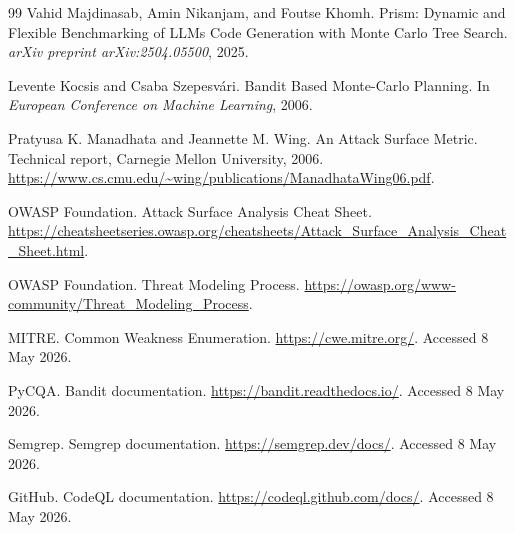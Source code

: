 \documentclass[11pt]{article}
\begin{document}
\begin{thebibliography}{99}
Vahid Majdinasab, Amin Nikanjam, and Foutse Khomh.
\newblock Prism: Dynamic and Flexible Benchmarking of LLMs Code Generation with Monte Carlo Tree Search.
\newblock \emph{arXiv preprint arXiv:2504.05500}, 2025.

Levente Kocsis and Csaba Szepesvári.
\newblock Bandit Based Monte-Carlo Planning.
\newblock In \emph{European Conference on Machine Learning}, 2006.

Pratyusa K. Manadhata and Jeannette M. Wing.
\newblock An Attack Surface Metric.
\newblock Technical report, Carnegie Mellon University, 2006.
\newblock \url{https://www.cs.cmu.edu/~wing/publications/ManadhataWing06.pdf}.

OWASP Foundation.
\newblock Attack Surface Analysis Cheat Sheet.
\newblock \url{https://cheatsheetseries.owasp.org/cheatsheets/Attack_Surface_Analysis_Cheat_Sheet.html}.

OWASP Foundation.
\newblock Threat Modeling Process.
\newblock \url{https://owasp.org/www-community/Threat_Modeling_Process}.

MITRE.
\newblock Common Weakness Enumeration.
\newblock \url{https://cwe.mitre.org/}. Accessed 8 May 2026.

PyCQA.
\newblock Bandit documentation.
\newblock \url{https://bandit.readthedocs.io/}. Accessed 8 May 2026.

Semgrep.
\newblock Semgrep documentation.
\newblock \url{https://semgrep.dev/docs/}. Accessed 8 May 2026.

GitHub.
\newblock CodeQL documentation.
\newblock \url{https://codeql.github.com/docs/}. Accessed 8 May 2026.

\end{thebibliography}
\end{document}
